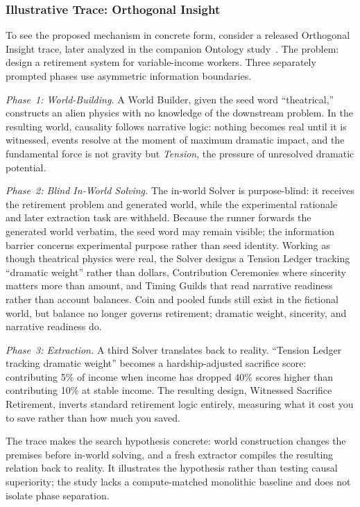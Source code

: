 \documentclass[11pt]{article}
\begin{document}
\subsubsection{Illustrative Trace: Orthogonal Insight}

To see the proposed mechanism in concrete form, consider a released Orthogonal Insight trace, later analyzed in the companion Ontology study~\cite{westerberg2025strangeworlds,westerberg2026ontology}. The problem: design a retirement system for variable-income workers. Three separately prompted phases use asymmetric information boundaries.

\emph{Phase~1: World-Building.} A World Builder, given the seed word ``theatrical,'' constructs an alien physics with no knowledge of the downstream problem. In the resulting world, causality follows narrative logic: nothing becomes real until it is witnessed, events resolve at the moment of maximum dramatic impact, and the fundamental force is not gravity but \emph{Tension}, the pressure of unresolved dramatic potential.

\emph{Phase~2: Blind In-World Solving.} The in-world Solver is purpose-blind: it receives the retirement problem and generated world, while the experimental rationale and later extraction task are withheld. Because the runner forwards the generated world verbatim, the seed word may remain visible; the information barrier concerns experimental purpose rather than seed identity. Working as though theatrical physics were real, the Solver designs a Tension Ledger tracking ``dramatic weight'' rather than dollars, Contribution Ceremonies where sincerity matters more than amount, and Timing Guilds that read narrative readiness rather than account balances. Coin and pooled funds still exist in the fictional world, but balance no longer governs retirement; dramatic weight, sincerity, and narrative readiness do.

\emph{Phase~3: Extraction.} A third Solver translates back to reality. ``Tension Ledger tracking dramatic weight'' becomes a hardship-adjusted sacrifice score: contributing 5\% of income when income has dropped 40\% scores higher than contributing 10\% at stable income. The resulting design, Witnessed Sacrifice Retirement, inverts standard retirement logic entirely, measuring what it cost you to save rather than how much you saved.

The trace makes the search hypothesis concrete: world construction changes the premises before in-world solving, and a fresh extractor compiles the resulting relation back to reality. It illustrates the hypothesis rather than testing causal superiority; the study lacks a compute-matched monolithic baseline and does not isolate phase separation.
\end{document}
